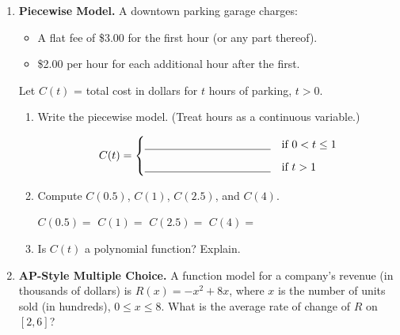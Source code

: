\documentclass[10pt]{article}
\begin{document}
\begin{enumerate}[itemsep=18pt]
\begin{enumerate}[label=(\alph*), itemsep=8pt]
        \item If $V(0) = 200$ gal, estimate $V(10)$ using the average rate of change.
              Is this an exact value or an approximation? Why?

              \vspace{0.06in}
              $V(10) \approx $ \blank{4cm} gal. This is an \blank{4cm} because \writeline
      \end{enumerate}

\item \textbf{Piecewise Model.} A downtown parking garage charges:
      \begin{itemize}[itemsep=2pt]
        \item A flat fee of \$3.00 for the first hour (or any part thereof).
        \item \$2.00 per hour for each additional hour after the first.
      \end{itemize}

      Let $C(t)$ = total cost in dollars for $t$ hours of parking, $t > 0$.

      \begin{enumerate}[label=(\alph*), itemsep=8pt]
        \item Write the piecewise model. (Treat hours as a continuous variable.)

              \[
                C(t) = \begin{cases}
                  \text{\blank{4cm}} & \text{if } 0 < t \leq 1 \\[6pt]
                  \text{\blank{4cm}} & \text{if } t > 1
                \end{cases}
              \]

        \item Compute $C(0.5)$, $C(1)$, $C(2.5)$, and $C(4)$.

              \vspace{0.06in}
              $C(0.5) = $ \blank{2cm} \quad $C(1) = $ \blank{2cm} \quad $C(2.5) = $ \blank{2cm} \quad $C(4) = $ \blank{2cm}

        \item Is $C(t)$ a polynomial function? Explain.

              \vspace{0.06in}
              \writeline
      \end{enumerate}

\item \textbf{AP-Style Multiple Choice.} A function model for a company's revenue (in thousands
      of dollars) is $R(x) = -x^2 + 8x$, where $x$ is the number of units sold (in hundreds),
      $0 \leq x \leq 8$. What is the average rate of change of $R$ on $[2, 6]$?


\end{enumerate}
\end{document}

